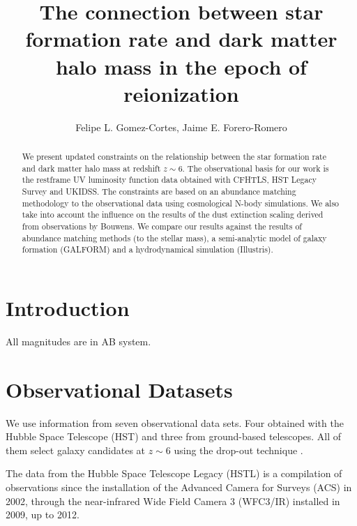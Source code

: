 \documentclass{emulateapj}
\begin{document}
\title{The connection between star formation rate and dark matter halo
  mass in the epoch of reionization}  


\author{Felipe L. Gomez-Cortes, Jaime E. Forero-Romero}  

\begin{abstract}
We present updated constraints on the relationship between the star
formation rate and dark matter halo mass at redshift $z\sim 6$.
The observational basis for our work is the restframe UV luminosity
function data obtained with CFHTLS, HST Legacy Survey and UKIDSS.
The constraints are based on an abundance matching methodology to the
observational data using cosmological N-body simulations.
We also take into account the influence on the results of the dust extinction
scaling derived from observations by Bouwens.
We compare our results against the results of abundance matching
methods (to the stellar mass), a semi-analytic model of galaxy
formation (GALFORM) and a hydrodynamical simulation (Illustris).
\end{abstract}


\section{Introduction}
\label{sec:intro}



All magnitudes are in AB system.
\section{Observational Datasets}
\label{sec:theo}


We use information from seven observational data sets.
Four obtained with the Hubble Space Telescope (HST) and three from
ground-based telescopes.
All of them select galaxy candidates at $z\sim 6$ using the drop-out
technique \citep{Steidel96}.  

The data from the Hubble Space Telescope Legacy (HSTL)
\citep{bouwens14} is a compilation   of observations since the
installation of the Advanced Camera for Surveys (ACS) in 2002,
through the near-infrared Wide Field Camera 3 (WFC3/IR) installed in
2009, up to 2012.  
\end{document}
